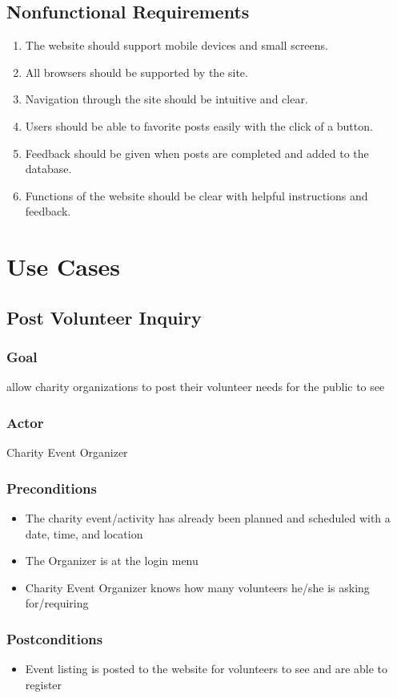 \documentclass[12pt]{article}
\begin{document}
\subsection{Nonfunctional Requirements}
\begin{enumerate}
\item
	The website should support mobile devices and small screens.
\item
	All browsers should be supported by the site.
\item
	Navigation through the site should be intuitive and clear.
\item
	Users should be able to favorite posts easily with the click of a button.
\item
	Feedback should be given when posts are completed and added to the database.
\item
	Functions of the website should be clear with helpful instructions and feedback.
\end{enumerate}
\section{Use Cases}
\subsection{Post Volunteer Inquiry}
\subsubsection{Goal}
allow charity organizations to post their volunteer needs for the public to see
\subsubsection{Actor}
Charity Event Organizer
\subsubsection{Preconditions}
\begin{itemize}
\item
	The charity event/activity has already been planned and scheduled with a date,
	time, and location
\item
	The Organizer is at the login menu
\item
	Charity Event Organizer knows how many volunteers he/she is asking for/requiring
\end{itemize}
\subsubsection{Postconditions}
\begin{itemize}
\item
	Event listing is posted to the website for volunteers to see and are able to
	register
\end{itemize}
\end{document}
